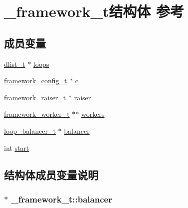 \hypertarget{a00013}{}\section{\+\_\+framework\+\_\+t结构体 参考}
\label{a00013}
\subsection*{成员变量}
\begin{DoxyCompactItemize}
\item 
\hyperlink{a00050_ad6644d67df4b4e3596c1eb12977d1d16_ad6644d67df4b4e3596c1eb12977d1d16}{dlist\+\_\+t} $\ast$ \hyperlink{a00013_acf1bfd1ee224a686a3af7d5ff7629248_acf1bfd1ee224a686a3af7d5ff7629248}{loops}
\item 
\hyperlink{a00050_a55b26efa9e6ee05514d087ba2593a54b_a55b26efa9e6ee05514d087ba2593a54b}{framework\+\_\+config\+\_\+t} $\ast$ \hyperlink{a00013_afe5323ec18afb54a631f5069fd2b904b_afe5323ec18afb54a631f5069fd2b904b}{c}
\item 
\hyperlink{a00050_aa3ac31db191829c9e6db624d660a2563_aa3ac31db191829c9e6db624d660a2563}{framework\+\_\+raiser\+\_\+t} $\ast$ \hyperlink{a00013_a07ba836ce414dded15aa2ebd1c5f0631_a07ba836ce414dded15aa2ebd1c5f0631}{raiser}
\item 
\hyperlink{a00050_aeb7a44e6b579659a8aae81f3ab819af3_aeb7a44e6b579659a8aae81f3ab819af3}{framework\+\_\+worker\+\_\+t} $\ast$$\ast$ \hyperlink{a00013_ae67335a4a11e73fa2c1bfdb0965c60c6_ae67335a4a11e73fa2c1bfdb0965c60c6}{workers}
\item 
\hyperlink{a00050_a649c7e850ab247b5f70ad27e335a129d_a649c7e850ab247b5f70ad27e335a129d}{loop\+\_\+balancer\+\_\+t} $\ast$ \hyperlink{a00013_a5ec36af472f9290ee5bdb4a7805b0ed3_a5ec36af472f9290ee5bdb4a7805b0ed3}{balancer}
\item 
int \hyperlink{a00013_a52822affef77067a5718084bd32253bd_a52822affef77067a5718084bd32253bd}{start}
\end{DoxyCompactItemize}


\subsection{结构体成员变量说明}
\hypertarget{a00013_a5ec36af472f9290ee5bdb4a7805b0ed3_a5ec36af472f9290ee5bdb4a7805b0ed3}{}
\subsubsection[{balancer}]{$\ast$ \+\_\+framework\+\_\+t\+::balancer}\label{a00013_a5ec36af472f9290ee5bdb4a7805b0ed3_a5ec36af472f9290ee5bdb4a7805b0ed3}
\hypertarget{a00013_afe5323ec18afb54a631f5069fd2b904b_afe5323ec18afb54a631f5069fd2b904b}{}
